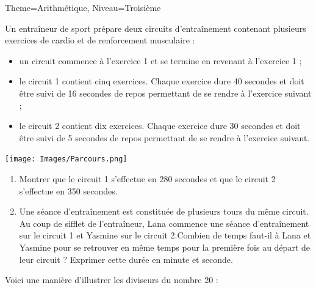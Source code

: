 \documentclass[11pt]{article}
\begin{document}
\begin{multicols}{2}
\begin{Maquette}[Fiche]{Theme=Arithmétique, Niveau=Troisième}
        \columnbreak
        \begin{exercice}[Source=DNB Juin 2024 Centres étrangers]
            Un entraîneur de sport prépare deux circuits d’entraînement contenant plusieurs exercices de cardio et de renforcement musculaire :
            \begin{itemize}
                \item un circuit commence à l’exercice 1 et se termine en revenant à l’exercice 1 ;
                \item le circuit 1 contient cinq exercices. Chaque exercice dure 40 secondes et doit être suivi de 16 secondes de repos permettant de se rendre à l’exercice suivant ;
                \item le circuit 2 contient dix exercices. Chaque exercice dure 30 secondes et doit être suivi de 5 secondes de repos permettant de se rendre à l’exercice suivant.
            \end{itemize}
            \begin{center}
                \texttt{[image: Images/Parcours.png]}
            \end{center}
            \begin{enumerate}
                \item Montrer que le circuit 1 s’effectue en 280 secondes et que le circuit 2 s’effectue en 350
                      secondes.
                \item Une séance d’entraînement est constituée de plusieurs tours du même circuit. Au coup de sifflet de l’entraîneur, Lana commence une séance d’entraînement sur le circuit 1 et Yasmine sur le circuit 2.Combien de temps faut-il à Lana et Yasmine pour se retrouver en même temps pour la première fois au départ de leur circuit ? Exprimer cette durée en minute et seconde.
            \end{enumerate}
        \end{exercice}

        \columnbreak

        \begin{exercice}
            Voici une manière d’illustrer les diviseurs du nombre 20 :

            \begin{center}
            \end{center}


\end{exercice}
\end{Maquette}
\end{multicols}
\end{document}
